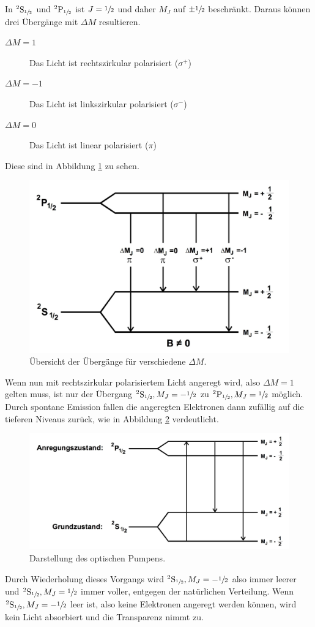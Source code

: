 In ${}^2\text{S}_{\sfrac{1}{2}}$ und ${}^2\text{P}_{\sfrac{1}{2}}$ ist $J={\sfrac{1}{2}}$ und daher $M_J$ auf $\pm \sfrac{1}{2}$ beschränkt. Daraus können drei Übergänge mit $\Delta M$ resultieren.
\begin{description}
	\item[$\Delta M=1$] Das Licht ist rechtszirkular polarisiert ($\sigma^{+}$)
	\item[$\Delta M=-1$] Das Licht ist linkszirkular polarisiert ($\sigma^{-}$)
	\item[$\Delta M=0$] Das Licht ist linear polarisiert ($\pi$)
\end{description}
Diese sind in Abbildung \ref{fig:ubergang} zu sehen.
\begin{figure}
	\centering
	\includegraphics[width=0.8\linewidth]{img/ubergange.jpg}
	\caption{Übersicht der Übergänge für verschiedene $\Delta M$.}
	\label{fig:ubergang}
\end{figure}
Wenn nun mit rechtszirkular polarisiertem Licht angeregt wird, also $\Delta M=1$ gelten muss, ist nur der Übergang ${}^2\text{S}_{\sfrac{1}{2}}, M_J=-\sfrac{1}{2}$ zu ${}^2\text{P}_{\sfrac{1}{2}}, M_J=\sfrac{1}{2}$ möglich. Durch spontane Emission fallen die angeregten Elektronen dann zufällig auf die tieferen Niveaus zurück, wie in Abbildung \ref{fig:optPumpen} verdeutlicht.
\begin{figure}
	\centering
	\includegraphics[width=0.8\linewidth]{img/optPumpen.jpg}
	\caption{Darstellung des optischen Pumpens.\cite{V21}}
	\label{fig:optPumpen}
\end{figure}
Durch Wiederholung dieses Vorgangs wird ${}^2\text{S}_{\sfrac{1}{2}}, M_J=-\sfrac{1}{2}$ also immer leerer und ${}^2\text{S}_{\sfrac{1}{2}},M_J=\sfrac{1}{2}$ immer voller, entgegen der natürlichen Verteilung. Wenn  ${}^2\text{S}_{\sfrac{1}{2}}, M_J=-\sfrac{1}{2}$ leer ist, also keine Elektronen angeregt werden können, wird kein Licht absorbiert und die Transparenz nimmt zu.

